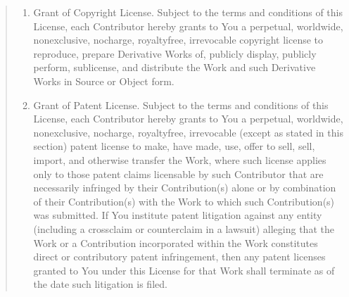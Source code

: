 \documentclass[letterpaper,10pt,english,openany,oneside]{sphinxmanual}
\begin{document}
\begin{quote}
\begin{enumerate}
\sphinxAtStartPar
“Derivative Works” shall mean any work, whether in Source or Object
form, that is based on (or derived from) the Work and for which the
editorial revisions, annotations, elaborations, or other modifications
represent, as a whole, an original work of authorship. For the purposes
of this License, Derivative Works shall not include works that remain
separable from, or merely link (or bind by name) to the interfaces of,
the Work and Derivative Works thereof.

\sphinxAtStartPar
“Contribution” shall mean any work of authorship, including
the original version of the Work and any modifications or additions
to that Work or Derivative Works thereof, that is intentionally
submitted to Licensor for inclusion in the Work by the copyright owner
or by an individual or Legal Entity authorized to submit on behalf of
the copyright owner. For the purposes of this definition, “submitted”
means any form of electronic, verbal, or written communication sent
to the Licensor or its representatives, including but not limited to
communication on electronic mailing lists, source code control systems,
and issue tracking systems that are managed by, or on behalf of, the
Licensor for the purpose of discussing and improving the Work, but
excluding communication that is conspicuously marked or otherwise
designated in writing by the copyright owner as “Not a Contribution.”

\sphinxAtStartPar
“Contributor” shall mean Licensor and any individual or Legal Entity
on behalf of whom a Contribution has been received by Licensor and
subsequently incorporated within the Work.

\item {} 
\sphinxAtStartPar
Grant of Copyright License. Subject to the terms and conditions of
this License, each Contributor hereby grants to You a perpetual,
worldwide, non\sphinxhyphen{}exclusive, no\sphinxhyphen{}charge, royalty\sphinxhyphen{}free, irrevocable
copyright license to reproduce, prepare Derivative Works of,
publicly display, publicly perform, sublicense, and distribute the
Work and such Derivative Works in Source or Object form.

\item {} 
\sphinxAtStartPar
Grant of Patent License. Subject to the terms and conditions of
this License, each Contributor hereby grants to You a perpetual,
worldwide, non\sphinxhyphen{}exclusive, no\sphinxhyphen{}charge, royalty\sphinxhyphen{}free, irrevocable
(except as stated in this section) patent license to make, have made,
use, offer to sell, sell, import, and otherwise transfer the Work,
where such license applies only to those patent claims licensable
by such Contributor that are necessarily infringed by their
Contribution(s) alone or by combination of their Contribution(s)
with the Work to which such Contribution(s) was submitted. If You
institute patent litigation against any entity (including a
cross\sphinxhyphen{}claim or counterclaim in a lawsuit) alleging that the Work
or a Contribution incorporated within the Work constitutes direct
or contributory patent infringement, then any patent licenses
granted to You under this License for that Work shall terminate
as of the date such litigation is filed.


\end{enumerate}
\end{quote}
\end{document}
